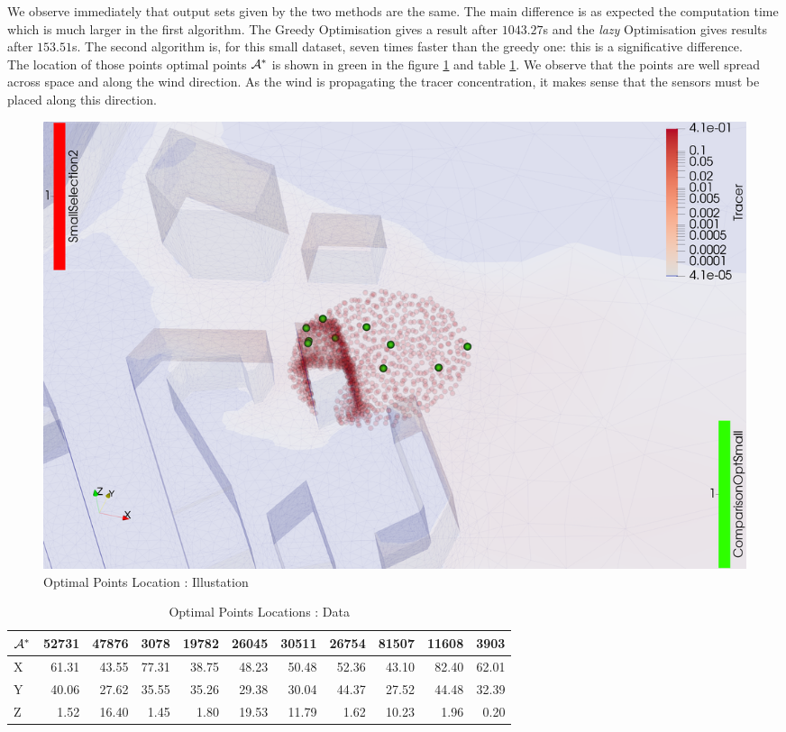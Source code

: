 We observe immediately that output sets given by the two methods are the same. The main difference is as expected the computation time which is much larger in the first algorithm. The Greedy Optimisation gives a result after $1043.27$s and the \textit{lazy} Optimisation gives results after $153.51 $s. The second algorithm is, for this small dataset, seven times faster than the greedy one: this is a significative difference. \\ 

The location of those points optimal points $\mathcal{A}^*$ is shown in green in the figure \ref{fig:opt_small} and table \ref{tab:opt_small}. We observe that the points are well spread across space and along the wind direction. As the wind is propagating the tracer concentration, it makes sense that the sensors must be placed along this direction. \\

\begin{figure}[h!]
\centering
    \includegraphics[width=0.8\linewidth]{figures/CompAlg/3rd/non_centered_60.35.0/optimal_screenshot}
    \caption{Optimal Points Location : Illustation}
    \label{fig:opt_small}
\end{figure}

\begin{table}[h]
\centering
\footnotesize
\begin{tabular}{|l|rrrrrrrrrr|}
\hline
$\mathcal{A}^*$ &  52731 &  47876 &  3078  &  19782 &  26045 &  30511 &  26754 &  81507 &  11608 &  3903  \\
\hline
X &  61.31 &  43.55 &  77.31 &  38.75 &  48.23 &  50.48 &  52.36 &  43.10 &  82.40 &  62.01 \\
Y &  40.06 &  27.62 &  35.55 &  35.26 &  29.38 &  30.04 &  44.37 &  27.52 &  44.48 &  32.39 \\
Z &   1.52 &  16.40 &   1.45 &   1.80 &  19.53 &  11.79 &   1.62 &  10.23 &   1.96 &   0.20 \\
\hline
\end{tabular}
\caption{Optimal Points Locations : Data}
\label{tab:opt_small}
\end{table}

